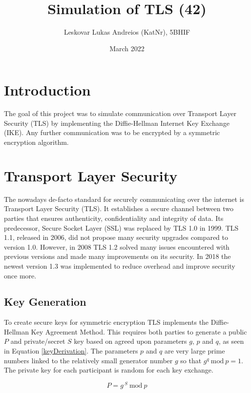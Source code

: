 \documentclass[12pt, letterpaper]{article}
\title{Simulation of TLS (42)}
\author{Leskovar Lukas Andreios (KatNr), 5BHIF}
\date{March 2022}
\begin{document}
\begin{titlepage}
\maketitle
\end{titlepage}

\tableofcontents
\newpage

\section{Introduction}
The goal of this project was to simulate communication over Transport Layer Security (TLS) by implementing the Diffie-Hellman Internet Key Exchange (IKE). Any further communication was to be encrypted by a symmetric encryption algorithm.

\section{Transport Layer Security}
The nowadays de-facto standard for securely communicating over the internet is Transport Layer Security (TLS). It establishes a secure channel between two parties that ensures authenticity, confidentiality and integrity of data.
Its predecessor, Secure Socket Layer (SSL) was replaced by TLS 1.0 in 1999. 
TLS 1.1, released in 2006, did not propose many security upgrades compared to version 1.0. However, in 2008 TLS 1.2 solved many issues encountered with previous versions and made many improvements on its security.
In 2018 the newest version 1.3 was implemented to reduce overhead and improve security once more. \cite{cloudflareTLS}

\subsection{Key Generation}
To create secure keys for symmetric encryption TLS implements the Diffie-Hellman Key Agreement Method. This requires both parties to generate a public $P$ and private/secret $S$ key based on agreed upon parameters $g$, $p$ and $q$, as seen in Equation \ref{keyDerivation}. The parameters $p$ and $q$ are very large prime numbers linked to the relatively small generator number $g$ so that $g^{q}\ \mathrm{mod}\ p = 1$. The private key for each participant is random for each key exchange. \cite{dierks1999rfc2246}

\begin{equation}\label{keyDerivation}
	P = g^{ \ S}\ \mathrm{mod}\ p
\end{equation}
\end{document}
